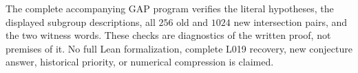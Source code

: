 \documentclass[11pt,a4paper]{article}
\begin{document}
The complete accompanying GAP program verifies the literal hypotheses,
the displayed subgroup descriptions, all $256$ old and $1024$ new
intersection pairs, and the two witness words. These checks are diagnostics
of the written proof, not premises of it. No full Lean formalization,
complete L019 recovery, new conjecture answer, historical priority, or
numerical compression is claimed.
\end{document}
